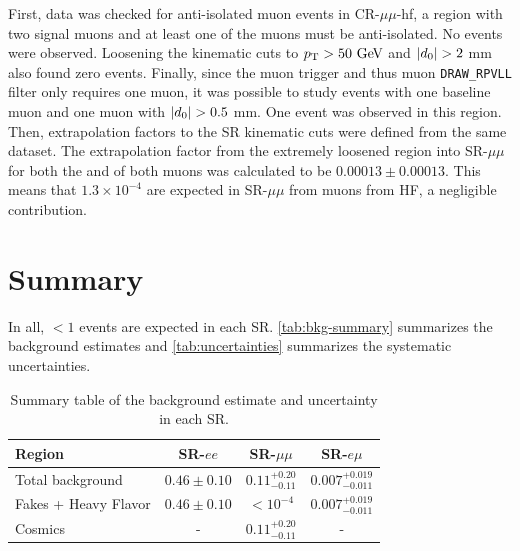 First, data was checked for anti-isolated muon events in CR-$\mu\mu$-hf, a region with two signal muons and at least one of the muons must be anti-isolated. No events were observed. Loosening the kinematic cuts to $\pt > 50 \GeV$ and $|d_0| > 2$ mm also found zero events. Finally, since the muon trigger and thus muon \texttt{DRAW\_RPVLL} filter only requires one muon, it was possible to study events with one baseline muon and one muon with $|d_0| > 0.5$ mm. One event was observed in this region. Then, extrapolation factors to the \ac{SR} kinematic cuts were defined from the same dataset. The extrapolation factor  from the extremely loosened region into SR-$\mu\mu$ for both the \absdz and \pt of both muons was calculated to be $0.00013 \pm 0.00013$. This means that $1.3 \times 10^{-4}$ are expected in SR-$\mu\mu$ from muons from \ac{HF}, a negligible contribution.


\section{Summary}

In all, $<1$ events are expected in each \ac{SR}. \autoref{tab:bkg-summary} summarizes the background estimates and \autoref{tab:uncertainties} summarizes the systematic uncertainties.

\begin{table}
\centering
\begin{tabular}{lccc}
Region 			 & SR-$ee$ 			& SR-$\mu\mu$ 				& SR-$e\mu$ \\
\hline
Total background & $0.46 \pm 0.10$ 	& $0.11 ^{+0.20}_{-0.11}$	& $0.007^{+0.019}_{-0.011}$\\
\hline
Fakes + Heavy Flavor 			 & $0.46 \pm 0.10$ 	& $< 10^{-4}$ 						& $0.007^{+0.019}_{-0.011}$\\
Cosmics 		 & - 				& $0.11 ^{+0.20}_{-0.11}$ 	& - \\
\hline
\end{tabular}
\caption{Summary table of the background estimate and uncertainty in each \ac{SR}.}
\label{tab:bkg-summary}
\end{table}


